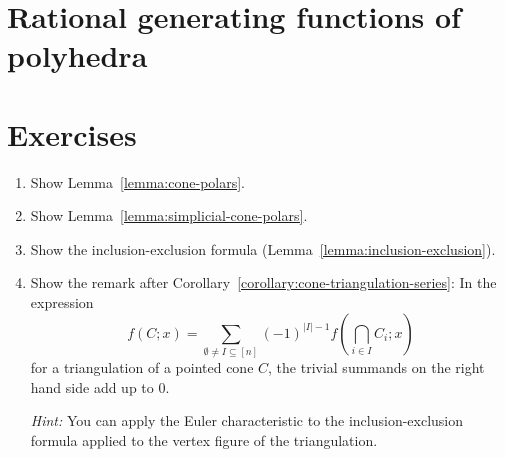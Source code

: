 \section{Rational generating functions of polyhedra}





\section*{Exercises}

\begin{enumerate}
  \item Show Lemma~\ref{lemma:cone-polars}.

  \item Show Lemma~\ref{lemma:simplicial-cone-polars}.

  \item Show the inclusion-exclusion formula (Lemma~\ref{lemma:inclusion-exclusion}).

  \item Show the remark after Corollary~\ref{corollary:cone-triangulation-series}:
    In the expression
    \[
      f(C;x) = \sum_{\emptyset \neq I \subseteq [n]} (-1)^{|I| - 1} f(\bigcap_{i \in I} C_i; x)
    \]
    for a triangulation of a pointed cone $C$,
    the trivial summands on the right hand side add up to $0$.

    \emph{Hint:} You can apply the Euler characteristic to the inclusion-exclusion formula applied to the vertex figure of the triangulation.
\end{enumerate}
